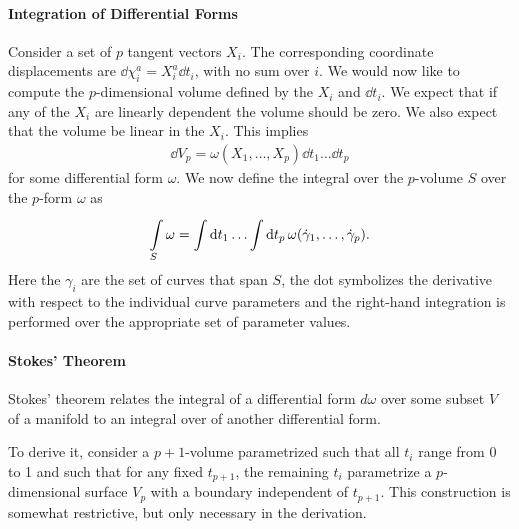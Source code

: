 \paragraph{Integration of Differential Forms}
Consider a set of $p$ tangent vectors $X_{i}$. The corresponding coordinate displacements are $\dd{\chi_{i}^{a}} = X_{i}^{a}\dd{t_{i}}$, with no sum over $i$. We would now like to compute the $p$-dimensional volume defined by the $X_{i}$ and $\dd{t_{i}}$. We expect that if any of the $X_{i}$ are linearly dependent the volume should be zero. We also expect that the volume be linear in the $X_{i}$. This implies
\begin{align*}
	\dd{V_{p}} = \omega(X_{1}, \dots, X_{p})\dd{t_{1}}\dots\dd{t_{p}}
\end{align*}
for some differential form $\omega$. We now define the integral over the $p$-volume $S$ over the $p$-form $\omega$ as
\begin{align*}
	\inte{S}{}{\omega} = \inte{}{}\dd{t_{1}}{\dots \inte{}{}\dd{t_{p}}{\omega(\dot{\gamma}_{1},\dots, \dot{\gamma}_{p})}}.
\end{align*}
Here the $\gamma_{i}$ are the set of curves that span $S$, the dot symbolizes the derivative with respect to the individual curve parameters and the right-hand integration is performed over the appropriate set of parameter values.

\paragraph{Stokes' Theorem}
Stokes' theorem relates the integral of a differential form $d\omega$ over some subset $V$ of a manifold to an integral over  of another differential form.

To derive it, consider a $p + 1$-volume parametrized such that all $t_{i}$ range from 0 to 1 and such that for any fixed $t_{p + 1}$, the remaining $t_{i}$ parametrize a $p$-dimensional surface $V_{p}$ with a boundary independent of $t_{p + 1}$. This construction is somewhat restrictive, but only necessary in the derivation.

